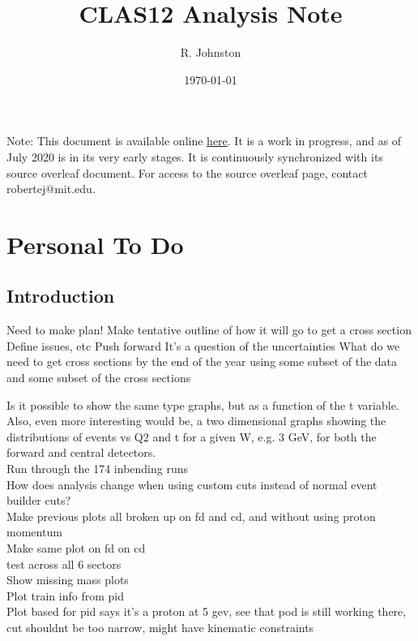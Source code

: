 \documentclass[oneside]{book}
\title{CLAS12 \DVEP Analysis Note}
\author{R. Johnston}
\date{\today}
\begin{document}
\maketitle
Note: This document is available online \href{https://latexonline.cc/compile?git=https\%3A\%2F\%2Fgithub.com\%2Frobertej19\%2FClas12AnaNote&target=main.tex&command=pdflatex\&trackId=1593973491329}{here}. It is a work in progress, and as of July 2020 is in its very early stages. It is continuously synchronized with its source overleaf document. For access to the source overleaf page, contact robertej@mit.edu. 


\iffalse
\chapter{Personal To Do}


\section{Introduction}
Need to make plan!
Make tentative outline of how it will go to get a cross section
Define issues, etc
Push forward
It’s a question of the uncertainties 
What do we need to get cross sections by the end of the year using some subset of the data and some subset of the cross sections

Is it possible to show the same type graphs, but as a function of the t variable. Also, even more interesting would be, a two dimensional graphs  showing the distributions of events vs Q2 and t  for a given W, e.g. 3 GeV, for both the forward and central detectors.\\

Run through the 174 inbending runs\\

How does analysis change when using custom cuts instead of normal event builder cuts?\\


Make previous plots all broken up on fd and cd, and without using proton momentum\\

Make same plot on fd on cd \\
test across all 6 sectors\\
Show missing mass plots\\
Plot train info from pid\\

Plot based for pid says it's a proton at 5 gev, see that pod is still working there, cut shouldnt be too narrow, might have kinematic constraints\\
\end{document}
